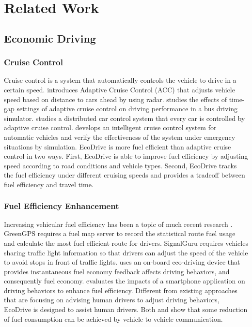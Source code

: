 
\chapter{Related Work}
\label{chapter_relatedwork}

\section{Economic Driving}

\subsection{Cruise Control}

Cruise control \cite{cruise_control} is a system that automatically
controls the vehicle to drive in a certain speed. 
\cite{bengtsson2001adaptive} introduces Adaptive Cruise Control (ACC)
that adjusts vehicle speed based on distance to cars ahead
by using radar. 
\cite{lin2009effects} studies the effects of time-gap
settings of adaptive cruise control on driving performance
in a bus driving simulator. 
\cite{loos2011adaptive} studies a distributed car control system
that every car is controlled by adaptive cruise control. 
\cite{ioannou1993autonomous} develops an intelligent cruise control system 
for automatic vehicles and verify the effectiveness of the system
under emergency situations by simulation.  
EcoDrive is more fuel efficient than adaptive cruise control 
in two ways. 
First, EcoDrive is able to improve fuel efficiency by 
adjusting speed according to road conditions and vehicle types. 
Second, EcoDrive tracks the fuel efficiency under different cruising
speeds and provides a tradeoff between fuel efficiency and travel time. 

\subsection{Fuel Efficiency Enhancement}

Increasing vehicular fuel efficiency has been a topic 
of much recent research \cite{ganti2010greengps, koukoumidis2011signalguru, 
boriboonsomsin2010eco, tulusan2012providing}.
GreenGPS \cite{ganti2010greengps} requires a fuel map server
to record the statistical route fuel usage and calculate the most
fuel efficient route for drivers. 
SignalGuru \cite{koukoumidis2011signalguru} requires vehicles sharing
traffic light information so that drivers can adjust the speed of
the vehicle to avoid stops in front of traffic lights. 
\cite{boriboonsomsin2010eco} uses an on-board eco-driving device 
that provides instantaneous fuel economy
feedback affects driving behaviors, and consequently fuel economy. 
\cite{tulusan2012providing} evaluates the impacts of a smartphone application
on driving behaviors to enhance fuel efficiency. 
Different from existing approaches that are focusing on advising human drivers to adjust driving behaviors, 
EcoDrive is designed to assist human drivers.
Both \cite{lang2013opportunities} and \cite{lang2014prediction} show that some reduction of fuel consumption can be achieved
by vehicle-to-vehicle communication. 


